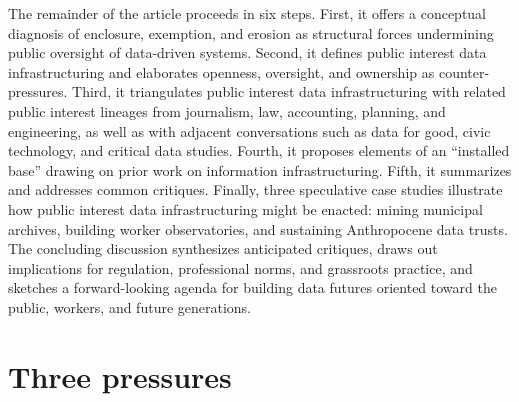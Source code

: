\documentclass[acmsmall,screen]{acmart}
\begin{document}
The remainder of the article proceeds in six steps. First, it offers a conceptual diagnosis of enclosure, exemption, and erosion as structural forces undermining public oversight of data-driven systems. Second, it defines public interest data infrastructuring and elaborates openness, oversight, and ownership as counter-pressures. Third, it triangulates public interest data infrastructuring with related public interest lineages from journalism, law, accounting, planning, and engineering, as well as with adjacent conversations such as data for good, civic technology, and critical data studies. Fourth, it proposes elements of an ``installed base'' drawing on prior work on information infrastructuring. Fifth, it summarizes and addresses common critiques. Finally, three speculative case studies illustrate how public interest data infrastructuring might be enacted: mining municipal archives, building worker observatories, and sustaining Anthropocene data trusts. The concluding discussion synthesizes anticipated critiques, draws out implications for regulation, professional norms, and grassroots practice, and sketches a forward-looking agenda for building data futures oriented toward the public, workers, and future generations.

\section*{Three pressures}
\end{document}
